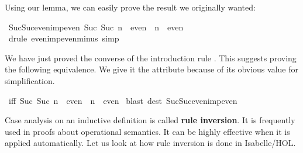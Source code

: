 \begin{isabellebody}
\begin{isamarkuptxt}
\medskip
Using our lemma, we can easily prove the result we originally wanted:%
\end{isamarkuptxt}%
\isamarkuptrue%
%
\endisatagproof
{\isafoldproof}%
%
\isadelimproof
%
\endisadelimproof
{}\isamarkupfalse%
\ Suc{\isacharunderscore}Suc{\isacharunderscore}even{\isacharunderscore}imp{\isacharunderscore}even{\isacharcolon}\ {\isachardoublequoteopen}Suc\ {\isacharparenleft}Suc\ n{\isacharparenright}\ {\isasymin}\ even\ {\isasymLongrightarrow}\ n\ {\isasymin}\ even{\isachardoublequoteclose}\isanewline
%
\isadelimproof
%
\endisadelimproof
%
\isatagproof
{}\isamarkupfalse%
\ {\isacharparenleft}drule\ even{\isacharunderscore}imp{\isacharunderscore}even{\isacharunderscore}minus{\isacharunderscore}{}{\isacharcomma}\ simp{\isacharparenright}%
\endisatagproof
{\isafoldproof}%
%
\isadelimproof
%
\endisadelimproof
%
\begin{isamarkuptext}%
We have just proved the converse of the introduction rule .
This suggests proving the following equivalence.  We give it the
 attribute because of its obvious value for simplification.%
\end{isamarkuptext}%
\isamarkuptrue%
\isamarkupfalse%
\ {\isacharbrackleft}iff{\isacharbrackright}{\isacharcolon}\ {\isachardoublequoteopen}{\isacharparenleft}{\isacharparenleft}Suc\ {\isacharparenleft}Suc\ n{\isacharparenright}{\isacharparenright}\ {\isasymin}\ even{\isacharparenright}\ {\isacharequal}\ {\isacharparenleft}n\ {\isasymin}\ even{\isacharparenright}{\isachardoublequoteclose}\isanewline
%
\isadelimproof
%
\endisadelimproof
%
\isatagproof
{}\isamarkupfalse%
\ {\isacharparenleft}blast\ dest{\isacharcolon}\ Suc{\isacharunderscore}Suc{\isacharunderscore}even{\isacharunderscore}imp{\isacharunderscore}even{\isacharparenright}%
\endisatagproof
{\isafoldproof}%
%
\isadelimproof
%
\endisadelimproof
%
\isamarkuptrue%
%
\begin{isamarkuptext}%
%
Case analysis on an inductive definition is called \textbf{rule
inversion}.  It is frequently used in proofs about operational
semantics.  It can be highly effective when it is applied
automatically.  Let us look at how rule inversion is done in
Isabelle/HOL\@.


\end{isamarkuptext}
\end{isabellebody}
